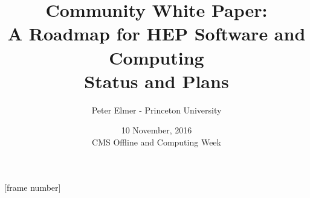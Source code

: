 \documentclass{beamer}
\title{Community White Paper: \\
       A Roadmap for HEP Software and Computing \\
       Status and Plans}
\author{Peter Elmer - Princeton University}
\date{10 November, 2016 \\ CMS Offline and Computing Week}
\begin{document}
\maketitle

%
%

[frame number]

%



%



%
%






%



%
%





%






%








%
\end{document}
